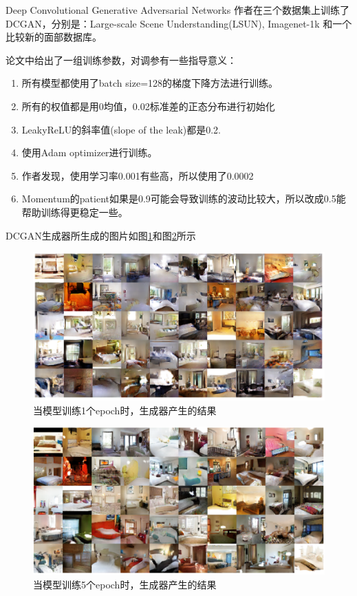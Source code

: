 \documentclass{ctexart}
\begin{document}
\begin{section}{Deep Convolutional Generative Adversarial Networks}
		作者在三个数据集上训练了DCGAN，分别是：Large-scale Scene Understanding(LSUN), Imagenet-1k 和一个比较新的面部数据库。
		
		论文中给出了一组训练参数，对调参有一些指导意义：
		
		\begin{enumerate}
			\item 所有模型都使用了batch size=128的梯度下降方法进行训练。
			\item 所有的权值都是用0均值，0.02标准差的正态分布进行初始化
			\item LeakyReLU的斜率值(slope of the leak)都是0.2.
			\item 使用Adam optimizer进行训练。
			\item 作者发现，使用学习率0.001有些高，所以使用了0.0002
			\item Momentum的patient如果是0.9可能会导致训练的波动比较大，所以改成0.5能帮助训练得更稳定一些。
		\end{enumerate}
		
		DCGAN生成器所生成的图片如图\ref{fig:dcgan-res-eph1}和图\ref{fig:dcgan-res-eph5}所示
		\begin{figure}
			\centering
			\includegraphics[width=35em]{figures/DCGAN-generated-image-epoch-1.png}
			\caption{当模型训练1个epoch时，生成器产生的结果}
			\label{fig:dcgan-res-eph1}
		\end{figure}
	
		\begin{figure}
			\centering
			\includegraphics[width=35em]{figures/DCGAN-generated-image-epoch-5.png}
			\caption{当模型训练5个epoch时，生成器产生的结果}
			\label{fig:dcgan-res-eph5}
		\end{figure}
	

\end{section}
\end{document}
